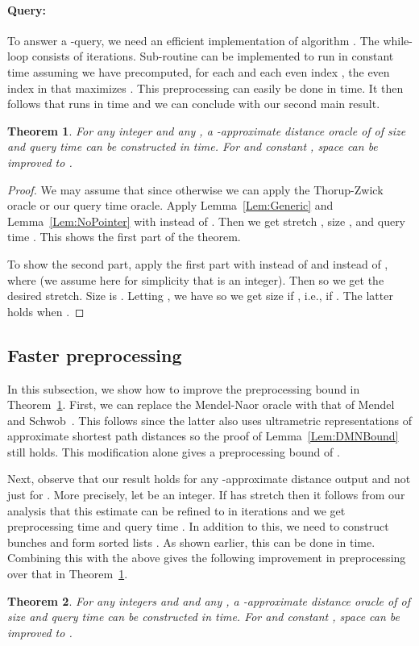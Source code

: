 \documentclass[11pt]{article}
\newtheorem{theorem}{Theorem}
\begin{document}
\paragraph{Query:} To answer a -query, we need an efficient implementation of algorithm . The while-loop consists of
 iterations. Sub-routine  can be implemented to run in constant time assuming we have
precomputed, for each  and each even index , the even index  in  that maximizes .
This preprocessing can easily be done in  time. It then follows that  runs in  time
and we can conclude with our second main result.
\begin{theorem}\label{Thm:ConstQuery}
For any integer  and any , a -approximate distance oracle of  of size
 and query time 
can be constructed in  time. For  and constant , space can be
improved to .
\end{theorem}
\begin{proof}
We may assume that  since otherwise we can apply the Thorup-Zwick oracle or our  query time oracle.
Apply Lemma~\ref{Lem:Generic} and Lemma~\ref{Lem:NoPointer} with  instead of .
Then we get stretch , size , and query time .
This shows the first part of the theorem.

To show the second part, apply the first part with  instead of  and 
instead of , where  (we assume here for simplicity that  is an integer).
Then  so we get the desired stretch. Size is .
Letting , we have  so we get size  if
, i.e., if . The latter holds when .
\end{proof}

\subsection{Faster preprocessing}\label{subsec:FasterPreproc}
In this subsection, we show how to improve the  preprocessing bound in
Theorem~\ref{Thm:ConstQuery}. First, we can replace the Mendel-Naor oracle with that of Mendel and Schwob~\cite{CKR}.
This follows since the latter also uses ultrametric representations of approximate shortest path distances so the proof of
Lemma~\ref{Lem:DMNBound} still holds. This modification alone gives a preprocessing bound of .

Next, observe that our result holds for any -approximate distance  output
and not just for . More
precisely, let  be an integer. If  has stretch  then it follows from our analysis that
this estimate can be refined to  in  iterations and we get preprocessing
time  and query time .
In addition to this, we need to construct bunches and form sorted lists . As shown earlier, this can be done in
 time. Combining this with the above gives the following improvement in
preprocessing over that in Theorem~\ref{Thm:ConstQuery}.
\begin{theorem}
For any integers  and  and any , a -approximate
distance oracle of  of size  and query time 
can be constructed in 
time. For  and constant , space can be improved to .
\end{theorem}
\end{document}
